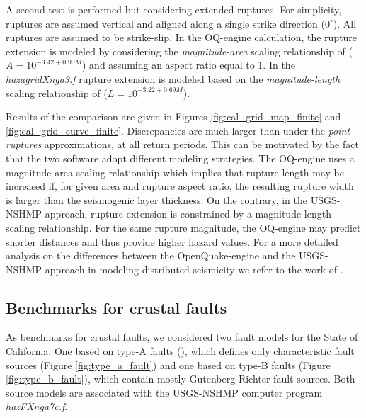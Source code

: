 A second test is performed but considering extended ruptures. For simplicity,
ruptures are assumed vertical and aligned along a single strike direction
($0^{\circ}$). All ruptures are assumed to be strike-slip. In the OQ-engine
calculation, the rupture extension is modeled by considering the
\textit{magnitude-area} scaling relationship of \citet{wells1994} ($A =
10^{-3.42 + 0.90 M}$) and assuming an aspect ratio equal to 1. In the
\textit{hazagridXnga3.f} rupture extension is modeled based on the
\textit{magnitude-length} scaling relationship of \citet{wells1994} ($L =
10^{-3.22+0.69 M}$).

Results of the comparison are given in Figures \ref{fig:cal_grid_map_finite} and
\ref{fig:cal_grid_curve_finite}. Discrepancies are much larger than under the
\textit{point ruptures} approximations, at all return periods. This can be
motivated by the fact that the two software adopt different modeling strategies.
The OQ-engine uses a magnitude-area scaling relationship which implies that
rupture length may be increased if, for given area and rupture aspect ratio, the
resulting rupture width is larger than the seismogenic layer thickness. On the
contrary, in the USGS-NSHMP approach, rupture extension is constrained by a
magnitude-length scaling relationship. For the same rupture magnitude, the
OQ-engine may predict shorter distances and thus provide higher hazard values.
For a more detailed analysis on the differences between the OpenQuake-engine and
the USGS-NSHMP approach in modeling distributed seismicity we refer to the work
of \citet{monelli2014}.
%
\subsection{Benchmarks for crustal faults}
As benchmarks for crustal faults, we considered two fault models for the State
of California. One based on type-A faults (\cite{petersen2008}), which defines
only characteristic fault sources (Figure \ref{fig:type_a_fault}) and one based
on type-B faults (Figure \ref{fig:type_b_fault}), which contain mostly
Gutenberg-Richter fault sources. Both source models are associated with the
USGS-NSHMP computer program \textit{hazFXnga7c.f}.

